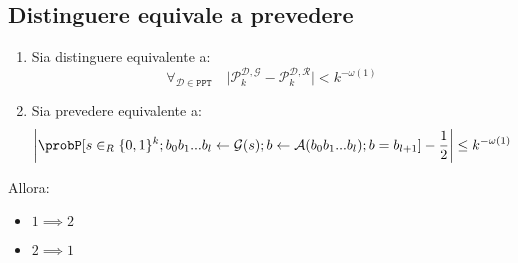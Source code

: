 \subsection{Distinguere equivale a prevedere}
\begin{theorem}
  \begin{enumerate}
    \item Sia distinguere equivalente a:
    \begin{equation}
      \forall_{\mathcal{D} \in \texttt{PPT}} \quad \bigg| \mathcal{P}_k^{\mathcal{D},\mathcal{G}}
      - \mathcal{P}_k^{\mathcal{D},\mathcal{R}} \bigg| < k^{-\omega(1)}
    \end{equation}
    \item Sia prevedere equivalente a:
    \begin{equation}
      \bigg| \probP[s \in_R \{0,1\}^k; b_0 b_1 ... b_l \gets \mathcal{G}(s);
      b \gets \mathcal{A}(b_0 b_1 ... b_l); b = b_{l+1}] - \frac{1}{2} \bigg| \leq k^{-\omega(1)}
    \end{equation}
  \end{enumerate}
  Allora:
  \begin{itemize}
    \item $1 \implies 2$
    \item $2 \implies 1$
  \end{itemize}

\end{theorem}
